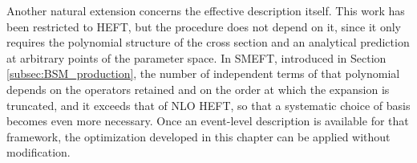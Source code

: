 
Another natural extension concerns the effective description itself. This work has been restricted to HEFT, but the procedure does not depend on it, since it only requires the polynomial structure of the cross section and an analytical prediction at arbitrary points of the parameter space. In SMEFT, introduced in Section \ref{subsec:BSM_production}, the number of independent terms of that polynomial depends on the operators retained and on the order at which the expansion is truncated, and it exceeds that of NLO HEFT, so that a systematic choice of basis becomes even more necessary. Once an event-level description is available for that framework, the optimization developed in this chapter can be applied without modification.



